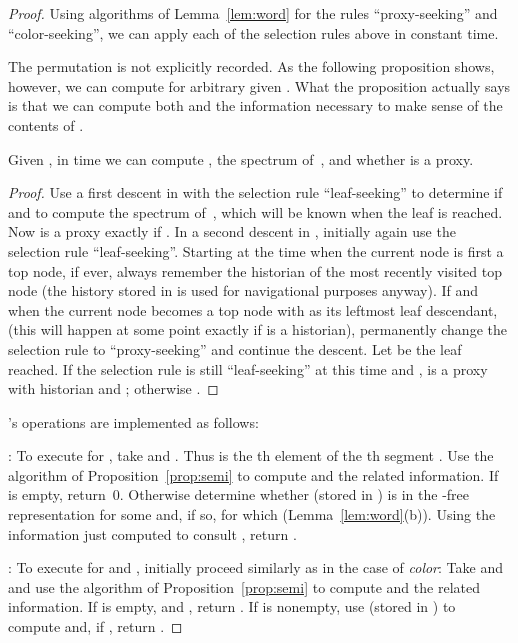 \documentclass[envcountsame,envcountsect,undated,nolinenumbers]{lnthi}
\def\Tvn#1{\hbox{\textit{#1\/}}}
\begin{document}
\begin{proof}
Using algorithms of Lemma~\ref{lem:word} for the rules
``proxy-seeking'' and ``color-seeking'',
we can apply each of the selection rules
above in constant time.

The permutation  is not explicitly recorded.
As the following proposition shows, however,
we can compute  for arbitrary given
.
What the proposition actually says is that we
can compute both  and the information
necessary to make sense of the 
contents of
.

\begin{proposition}
\label{prop:semi}Given , in  time
we can compute , the spectrum of~,
and whether  is a proxy.
\end{proposition}

\begin{proof}
Use a first descent in  with the selection rule
``leaf-seeking'' to 
determine if  and to
compute the spectrum of~,
which will be known when the leaf  is reached.
Now  is a proxy exactly if .
In a second descent in ,
initially again use the selection rule
``leaf-seeking''.
Starting at the time when the current node
is first a top node, if ever, always remember
the historian  of the
most recently visited top node
(the history stored in  is used for navigational
purposes anyway).
If and when the current node becomes a top node
with  as its leftmost leaf descendant,
(this will happen at some point exactly if
 is a historian),
permanently change the
selection rule to ``proxy-seeking'' and
continue the descent.
Let  be the leaf reached.
If the selection rule is still ``leaf-seeking'' at this time 
and , 
 is a proxy with historian  and
;
otherwise .
\end{proof}

\noindent
's operations are implemented as follows:

\medskip\noindent
:
To execute 
for , take
 and .
Thus  is the th element of the
th segment .
Use the algorithm of
Proposition~\ref{prop:semi} to compute
 and the related information.
If  is empty, return~0.
Otherwise determine whether 
(stored in ) is
in the -free representation for some
 and, if so, for which 
(Lemma~\ref{lem:word}(b)).
Using the information just computed to
consult ,
return .

\medskip\noindent
:
To execute 
for  and ,
initially proceed similarly as in
the case of \Tvn{color}:
Take  and 
and use the algorithm of
Proposition~\ref{prop:semi} to compute
 and the related information.
If  is empty,  and ,
return .
If  is nonempty, 
use  (stored in ) to
compute 
and, if , return .


\end{proof}
\end{document}
